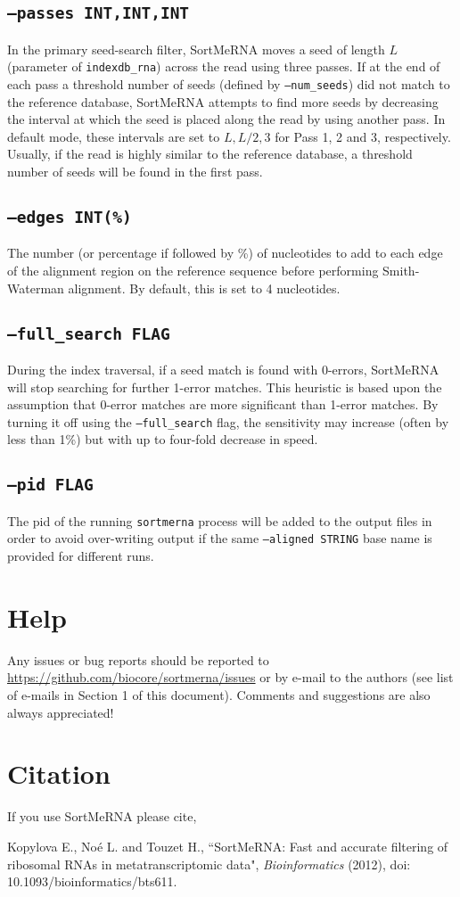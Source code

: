 \documentclass[10pt,a4paper]{article}
\begin{document}
\subsection*{{\tt --passes INT,INT,INT}}
In the primary seed-search filter, SortMeRNA moves a seed of length $L$ (parameter of {\tt indexdb\_rna}) 
across the read using three passes. If at the end of each pass a threshold number of seeds (defined by {\tt --num\_seeds}) 
did not match to the reference database, SortMeRNA attempts to find more seeds by decreasing the interval at which the 
seed is placed along the read by using another pass. In default mode, these intervals are set to 
$L,L/2,3$ for Pass 1, 2 and 3, respectively. Usually, if the read is highly similar to the reference
database, a threshold number of seeds will be found in the first pass.

\subsection*{{\tt --edges INT(\%)}}
The number (or percentage if followed by \%) of nucleotides to add to each edge of the alignment region 
on the reference sequence before performing Smith-Waterman alignment. By default, this is set to 4 nucleotides.

\subsection*{{\tt --full\_search FLAG}}
During the index traversal, if a seed match is found with 0-errors, SortMeRNA will stop searching for further
1-error matches. This heuristic is based upon the assumption that 0-error matches are more significant than
1-error matches. By turning it off using the {\tt--full\_search} flag, the sensitivity may increase (often
by less than 1\%) but with up to four-fold decrease in speed.

\subsection*{{\tt --pid FLAG}}
The pid of the running {\tt sortmerna} process will be added to the output files in order to avoid over-writing output if the same
{\tt --aligned STRING} base name is provided for different runs. 

\section{Help}

Any issues or bug reports should be reported to \url{https://github.com/biocore/sortmerna/issues} or by e-mail
to the authors (see list of e-mails in Section 1 of this document). Comments and suggestions are also always appreciated!

\section{Citation}

If you use SortMeRNA please cite,

Kopylova E., No\'{e} L. and Touzet H., ``SortMeRNA: Fast and accurate filtering of ribosomal RNAs in metatranscriptomic data", {\it Bioinformatics} (2012), doi: 10.1093/bioinformatics/bts611.
\end{document}
